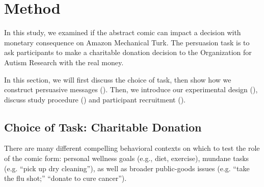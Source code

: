 \section{Method}
\label{sec:Method}
In this study, we examined if the abstract comic can impact a decision with monetary consequence on Amazon Mechanical Turk. The persuasion task is to ask participants to make a charitable donation decision to the Organization for Autism Research with the real money. 

In this section, we will first discuss the choice of task, then show how we construct persuasive messages (). Then, we introduce our experimental design (), discuss study procedure () and participant recruitment ().


\subsection{Choice of Task: Charitable Donation}
\label{sub:Choice of Task: Charitable Donation}


There are many different compelling behavioral contexts on which to test the role of the comic form: personal wellness goals (e.g., diet, exercise), mundane tasks (e.g. ``pick up dry cleaning''), as well as broader public-goods issues (e.g. ``take the flu shot;'' ``donate to cure cancer'').

